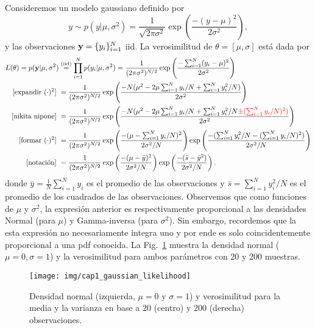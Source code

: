 \begin{mdframed}[style=ejemplo, frametitle={\center Ejemplo: Verosimilitud para el modelo gaussiano  (muestras  independientes)}]

Consideremos un  modelo gaussiano definido por 
\begin{equation}
	y \sim p(y|\mu,\sigma^2) = \frac{1}{\sqrt{2\pi\sigma^2}}\exp\left(\frac{-(y-\mu)^2}{2\sigma^2}\right),
\end{equation}
y las observaciones $\mathbf{y} = \{y_i\}_{i=1}^N$ iid. La verosimilitud  de $\theta  =  [\mu,\sigma]$ está dada por 
\begin{align}
  	L(\theta)  =  p(\mathbf{y}|\mu,\sigma^2) 
  				&\stackrel{\text{(iid)}}{=}\prod_{i=1}^N p(y_i|\mu,\sigma^2) 
  				 = \frac{1}{(2\pi\sigma^2)^{N/2}}  \exp\left(\frac{-\sum_{i=1}^N(y_i-\mu)^2}{2\sigma^2}\right)\\
  				\text{[expandir $(\cdot)^2$]}\  & = \frac{1}{(2\pi\sigma^2)^{N/2}}  \exp\left(\frac{-N(\mu^2 - 2\mu\sum_{i=1}^Ny_i/N + \sum_{i=1}^Ny_i^2/N)}{2\sigma^2}\right)\nonumber\\
  				\text{[nikita nipone]}\  & = \frac{1}{(2\pi\sigma^2)^{N/2}}  \exp\left(\frac{-N(\mu^2 - 2\mu\sum_{i=1}^Ny_i/N + \sum_{i=1}^Ny_i^2/N \textcolor{red}{ \pm (\sum_{i=1}^Ny_i/N)^2)}}{2\sigma^2}\right)\nonumber\\
  				\text{[formar $(\cdot)^2$]}\  & = \frac{1}{(2\pi\sigma^2)^{N/2}}  \exp\left(\frac{-(\mu - \sum_{i=1}^Ny_i/N)^2}{2\sigma^2/N}\right)
  				\exp\left(\frac{-(\sum_{i=1}^Ny_i^2/N  - (\sum_{i=1}^Ny_i/N)^2)}{2\sigma^2/N}\right)
  				\nonumber\\
  				\text{[notación]}\  & = \frac{1}{(2\pi\sigma^2)^{N/2}}  \exp\left(\frac{-(\mu - \bar y)^2}{2\sigma^2/N}\right)
  				\exp\left(\frac{-(\bar s  - \bar y^2)}{2\sigma^2/N}\right)
  				\nonumber.
  \end{align}  
  donde $\bar y = \tfrac{1}{N}\sum_{i=1}^Ny_i$ es el promedio de las observaciones y $\bar s = \sum_ {i=1}^Ny_i^2/N$ es el promedio de los cuadrados de las observaciones. Observemos que como funciones de $\mu$ y $\sigma^2$, la expresión anterior es respectivamente  proporcional a las densidades Normal (para $\mu$) y Gamma-inversa (para $\sigma^2$). Sin embargo, recordemos que la esta  expresión no necesariamente integra uno y por  ende es solo coincidentemente proporcional a una pdf conocida. La Fig.~\ref{fig:gaussian_likelihood} muestra la  densidad normal ($\mu=0,\sigma=1$) y la verosimilitud para ambos parámetros con 20 y 200 muestras. 


\begin{figure}[H]
	\centering
	\texttt{[image: img/cap1\_gaussian\_likelihood]}\\
	\caption{Densidad normal (izquierda, $\mu=0$ y $\sigma=1$) y verosimilitud para la media y la varianza en base a 20 (centro) y 200 (derecha) observaciones.}
	\label{fig:gaussian_likelihood}  
\end{figure}
  


\end{mdframed}

